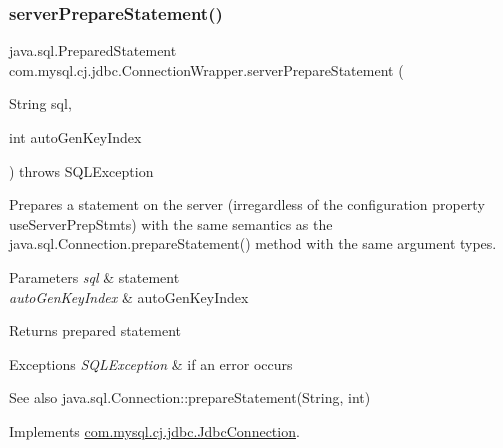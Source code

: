 \mbox{\label{classcom_1_1mysql_1_1cj_1_1jdbc_1_1_connection_wrapper_a86037101987ec03d10b75dbba23a8dff}} 
\subsubsection{\texorpdfstring{server\+Prepare\+Statement()}{serverPrepareStatement()}\hspace{0.1cm}{\footnotesize\ttfamily [2/6]}}
{\footnotesize\ttfamily java.\+sql.\+Prepared\+Statement com.\+mysql.\+cj.\+jdbc.\+Connection\+Wrapper.\+server\+Prepare\+Statement (\begin{DoxyParamCaption}\item[{String}]{sql,  }\item[{int}]{auto\+Gen\+Key\+Index }\end{DoxyParamCaption}) throws S\+Q\+L\+Exception}

Prepares a statement on the server (irregardless of the configuration property \textquotesingle{}use\+Server\+Prep\+Stmts\textquotesingle{}) with the same semantics as the java.\+sql.\+Connection.\+prepare\+Statement() method with the same argument types.


\begin{DoxyParams}{Parameters}
{\em sql} & statement \\
\hline
{\em auto\+Gen\+Key\+Index} & auto\+Gen\+Key\+Index \\
\hline
\end{DoxyParams}
\begin{DoxyReturn}{Returns}
prepared statement 
\end{DoxyReturn}

\begin{DoxyExceptions}{Exceptions}
{\em S\+Q\+L\+Exception} & if an error occurs \\
\hline
\end{DoxyExceptions}
\begin{DoxySeeAlso}{See also}
java.\+sql.\+Connection\+::prepare\+Statement(\+String, int) 
\end{DoxySeeAlso}


Implements \mbox{\hyperlink{interfacecom_1_1mysql_1_1cj_1_1jdbc_1_1_jdbc_connection_a9deb2cebf6538a53be5f24c52ee39f22}{com.\+mysql.\+cj.\+jdbc.\+Jdbc\+Connection}}.

